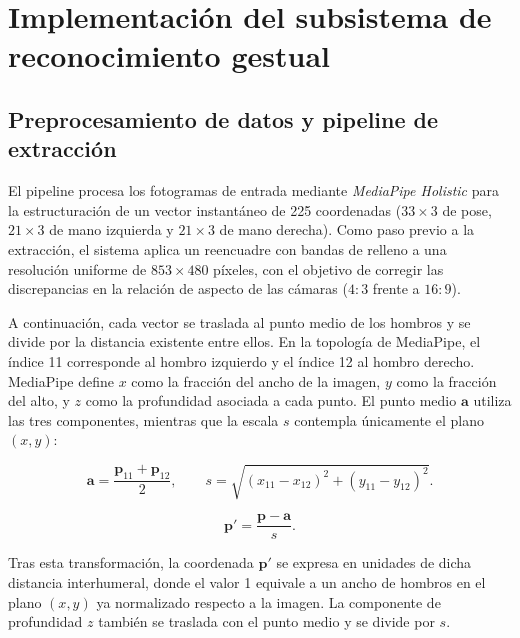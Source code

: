 \section{Implementación del subsistema de reconocimiento gestual}

\subsection{Preprocesamiento de datos y pipeline de extracción}
El pipeline procesa los fotogramas de entrada mediante \textit{MediaPipe Holistic} para la estructuración de un vector instantáneo de 225 coordenadas ($33 \times 3$ de pose, $21 \times 3$ de mano izquierda y $21 \times 3$ de mano derecha). Como paso previo a la extracción, el sistema aplica un reencuadre con bandas de relleno a una resolución uniforme de $853 \times 480$ píxeles, con el objetivo de corregir las discrepancias en la relación de aspecto de las cámaras ($4:3$ frente a $16:9$). 

A continuación, cada vector se traslada al punto medio de los hombros y se divide por la distancia existente entre ellos. En la topología de MediaPipe, el índice 11 corresponde al hombro izquierdo y el índice 12 al hombro derecho. MediaPipe define $x$ como la fracción del ancho de la imagen, $y$ como la fracción del alto, y $z$ como la profundidad asociada a cada punto. El punto medio $\mathbf{a}$ utiliza las tres componentes, mientras que la escala $s$ contempla únicamente el plano $(x, y)$:

\begin{equation}
\mathbf{a} = \frac{\mathbf{p}_{11}+\mathbf{p}_{12}}{2},
\qquad
s = \sqrt{(x_{11}-x_{12})^{2}+(y_{11}-y_{12})^{2}}.
\label{eq:ancla_hombros}
\end{equation}

\begin{equation}
\mathbf{p}' = \frac{\mathbf{p}-\mathbf{a}}{s}.
\label{eq:norm_hombros}
\end{equation}

Tras esta transformación, la coordenada $\mathbf{p}'$ se expresa en unidades de dicha distancia interhumeral, donde el valor 1 equivale a un ancho de hombros en el plano $(x, y)$ ya normalizado respecto a la imagen. La componente de profundidad $z$ también se traslada con el punto medio y se divide por $s$.

